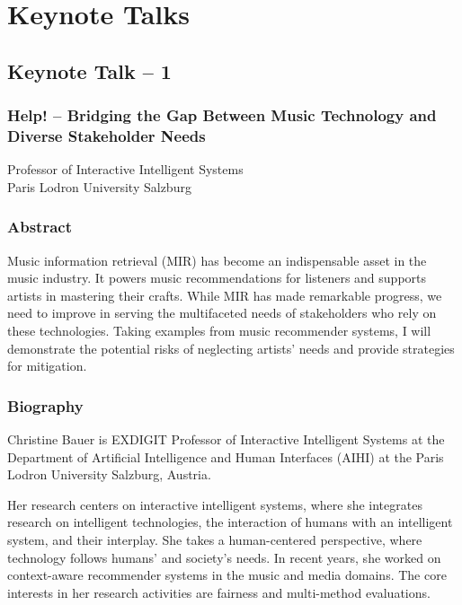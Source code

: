 \chapter*{Keynote Talks}
\cleardoublepage


{}
\section*{Keynote Talk -- 1}
\subsection*{Help! -- Bridging the Gap Between Music Technology and Diverse Stakeholder Needs}

Professor of Interactive Intelligent Systems\\
Paris Lodron University Salzburg


\subsection*{Abstract}
Music information retrieval (MIR) has become an indispensable asset in the music industry. It powers music recommendations for listeners and supports artists in mastering their crafts. While MIR has made remarkable progress, we need to improve in serving the multifaceted needs of stakeholders who rely on these technologies. Taking examples from music recommender systems, I will demonstrate the potential risks of neglecting artists' needs and provide strategies for mitigation.

\subsection*{Biography}
Christine Bauer is EXDIGIT Professor of Interactive Intelligent Systems at the Department of Artificial Intelligence and Human Interfaces (AIHI) at the Paris Lodron University Salzburg, Austria.

Her research centers on interactive intelligent systems, where she integrates research on intelligent technologies, the interaction of humans with an intelligent system, and their interplay. She takes a human-centered perspective, where technology follows humans' and society's needs. In recent years, she worked on context-aware recommender systems in the music and media domains. The core interests in her research activities are fairness and multi-method evaluations.

